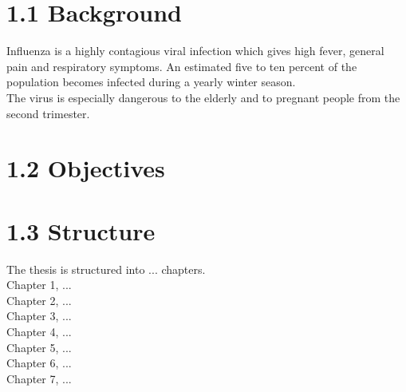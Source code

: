 \section*{1.1 Background}
Influenza is a highly contagious viral infection which gives high fever, general pain and respiratory symptoms. An estimated five to ten percent of the population becomes infected during a yearly winter season.\\ The virus is especially dangerous to the elderly and to pregnant people from the second trimester.


\section*{1.2 Objectives}

\section*{1.3 Structure}
The thesis is structured into ... chapters.\\
Chapter 1, ...\\
Chapter 2, ...\\
Chapter 3, ...\\
Chapter 4, ...\\
Chapter 5, ...\\
Chapter 6, ...\\
Chapter 7, ...\\